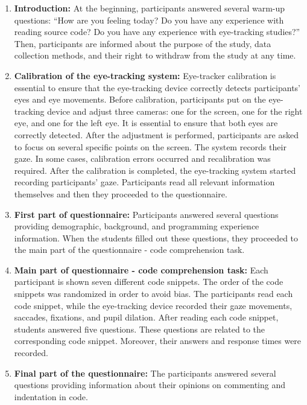 \begin{enumerate}
    \item \textbf{Introduction:} At the beginning, participants answered several warm-up questions: “How are you feeling today? Do you have any experience with reading source code? Do you have any experience with eye-tracking studies?”  Then, participants are informed about the purpose of the study, data collection methods, and their right to withdraw from the study at any time.

    \item \textbf{Calibration of the eye-tracking system:} 
    Eye-tracker calibration is essential to ensure that the eye-tracking device correctly detects participants’ eyes and eye movements. Before calibration, participants put on the eye-tracking device and adjust three cameras: one for the screen, one for the right eye, and one for the left eye. It is essential to ensure that both eyes are correctly detected. After the adjustment is performed, participants are asked to focus on several specific points on the screen. The system records their gaze. In some cases, calibration errors occurred and recalibration was required. After the calibration is completed, the eye-tracking system started recording participants’ gaze. Participants read all relevant information themselves and then they proceeded to the questionnaire.
    
    \item \textbf{First part of questionnaire:}  
    Participants answered several questions providing demographic, background, and programming experience information. When the students filled out these questions, they proceeded to the main part of the questionnaire - code comprehension task.

    \item \textbf{Main part of questionnaire - code comprehension task:}  Each participant is shown seven different code snippets. The order of the code snippets was randomized in order to avoid bias. The participants read each code snippet, while the eye-tracking device recorded their gaze movements, saccades, fixations, and pupil dilation. After reading each code snippet, students answered five questions. These questions are related to the corresponding code snippet. Moreover, their answers and response times were recorded.

    \item \textbf{Final part of the questionnaire:} 
    The participants answered several questions providing information about their opinions on commenting and indentation in code.


\end{enumerate}
